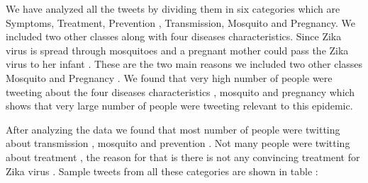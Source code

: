 We have analyzed all the tweets by dividing  them in six categories which are Symptoms, Treatment, Prevention , Transmission, Mosquito and Pregnancy. We included two other classes along with four diseases characteristics. Since Zika virus is spread through  mosquitoes and a pregnant mother could pass the Zika virus to her infant  . These are the two main reasons we included two other classes Mosquito and Pregnancy .
We found that very high number of people were tweeting  about the four diseases characteristics , mosquito and pregnancy which shows that very large number of people were tweeting relevant to this epidemic.
\par After analyzing the data we found that most number of people were twitting about transmission , mosquito and prevention . Not many people were twitting about treatment , the reason for that is there is not any convincing  treatment for Zika virus  . Sample tweets from all these categories are shown in table :

